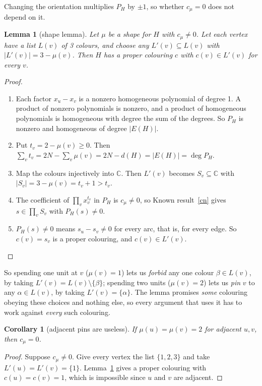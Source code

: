 \documentclass[11pt]{article}
\theoremstyle{plain}
\newtheorem{lemma}[theorem]{Lemma}
\newtheorem{corollary}[theorem]{Corollary}
\theoremstyle{definition}
\theoremstyle{remark}
\newcommand{\C}{\mathbb{C}}
\newcommand{\sm}{\setminus}
\newenvironment{steps}[1][]{\begin{enumerate}[label=\textbf{Step \arabic*.},leftmargin=4.4em,itemsep=0.35em,#1]}{\end{enumerate}}
\begin{document}
Changing the orientation multiplies $P_H$ by $\pm 1$, so whether $c_\mu = 0$ does not depend on it.

\begin{lemma}[shape lemma]\label{shape}
Let $\mu$ be a shape for $H$ with $c_\mu \ne 0$. Let each vertex have a list $L(v)$ of 3 colours, and choose any
$L'(v) \subseteq L(v)$ with $|L'(v)| = 3 - \mu(v)$. Then $H$ has a proper colouring $c$ with $c(v) \in L'(v)$ for
every $v$.
\end{lemma}

\begin{proof}
\begin{steps}
\item Each factor $x_u - x_v$ is a nonzero homogeneous polynomial of degree 1. A product of nonzero
polynomials is nonzero, and a product of homogeneous polynomials is homogeneous with degree the sum of the
degrees. So $P_H$ is nonzero and homogeneous of degree $|E(H)|$.
\item Put $t_v = 2 - \mu(v) \ge 0$. Then $\sum_v t_v = 2N - \sum_v \mu(v) = 2N - d(H) = |E(H)| = \deg P_H$.
\item Map the colours injectively into $\C$. Then $L'(v)$ becomes $S_v \subseteq \C$ with
$|S_v| = 3 - \mu(v) = t_v + 1 > t_v$.
\item The coefficient of $\prod_v x_v^{t_v}$ in $P_H$ is $c_\mu \ne 0$, so Known result~\ref{cn} gives
$s \in \prod_v S_v$ with $P_H(s) \ne 0$.
\item $P_H(s) \ne 0$ means $s_u - s_v \ne 0$ for every arc, that is, for every edge. So $c(v) = s_v$ is a proper
colouring, and $c(v) \in L'(v)$. \qedhere
\end{steps}
\end{proof}

So spending one unit at $v$ ($\mu(v) = 1$) lets us \emph{forbid} any one colour $\beta \in L(v)$, by taking
$L'(v) = L(v) \sm \{\beta\}$; spending two units ($\mu(v) = 2$) lets us \emph{pin} $v$ to any $\alpha \in L(v)$, by
taking $L'(v) = \{\alpha\}$. The lemma promises \emph{some} colouring obeying these choices and nothing else, so
every argument that uses it has to work against \emph{every} such colouring.

\begin{corollary}[adjacent pins are useless]\label{adjpin}
If $\mu(u) = \mu(v) = 2$ for adjacent $u, v$, then $c_\mu = 0$.
\end{corollary}

\begin{proof}
Suppose $c_\mu \ne 0$. Give every vertex the list $\{1,2,3\}$ and take $L'(u) = L'(v) = \{1\}$. Lemma~\ref{shape}
gives a proper colouring with $c(u) = c(v) = 1$, which is impossible since $u$ and $v$ are adjacent.
\end{proof}
\end{document}
